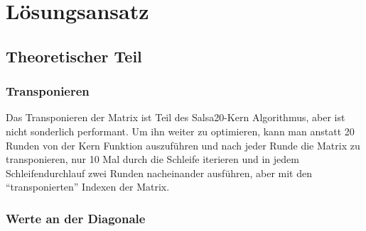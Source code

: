 \documentclass[course=erap]{aspdoc}
\begin{document}
\section{Lösungsansatz}
\subsection{Theoretischer Teil}
\subsubsection{Transponieren}
Das Transponieren der Matrix ist Teil des Salsa20-Kern Algorithmus, aber ist nicht sonderlich performant. Um ihn weiter zu optimieren, 
kann man anstatt 20 Runden von der Kern Funktion auszuführen und nach jeder Runde die Matrix zu transponieren, nur 10 Mal durch die Schleife iterieren
und in jedem Schleifendurchlauf zwei Runden nacheinander ausführen, aber mit den ``transponierten'' Indexen der Matrix.   
\subsubsection{Werte an der Diagonale}
\end{document}
